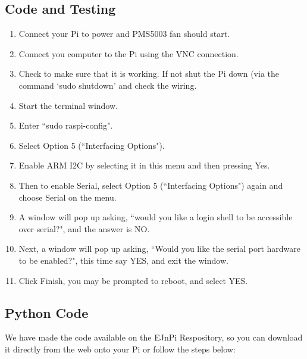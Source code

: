 \documentclass{article}
\begin{document}
\subsection{Code and Testing}

\begin{enumerate}
  \item Connect your Pi to power and PMS5003 fan should start.
  \item Connect you computer to the Pi using the VNC connection.
  \item Check to make sure that it is working. If not shut the Pi down (via the command `sudo shutdown' and check the wiring.

\item Start the terminal window.

\item Enter ``sudo raspi-config".

\item Select Option 5 (``Interfacing Options").

\item Enable ARM I2C by selecting it in this menu and then pressing Yes.

\item Then to enable Serial, select Option 5 (``Interfacing Options") again and choose Serial on the menu. 

\item A window will pop up asking, ``would you like a login shell to be accessible over serial?", and the answer is NO.

\item Next, a window will pop up asking, ``Would you like the serial port hardware to be enabled?", this time say YES, and exit the window.

\item Click Finish, you may be prompted to reboot, and select YES.



\end{enumerate}

\subsection{Python Code}

We have made the code available on the EJnPi Respository, so you can download it directly from the web onto your Pi or follow the steps below:
\end{document}
